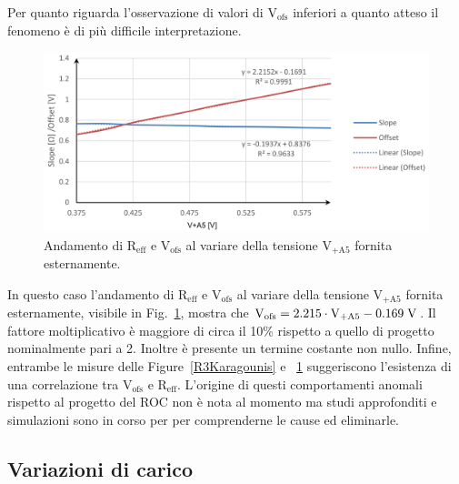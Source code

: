 Per quanto riguarda l'osservazione di valori di $\mathrm{V_{ofs}}$ inferiori a quanto atteso il fenomeno è di più difficile interpretazione.
\begin{figure}
\centering
\includegraphics[width=\textwidth]{Immagini/OffsetKaragounis}
\caption{Andamento di $\mathrm{R_{eff}}$ e $\mathrm{V_{ofs}}$ al variare della tensione $\mathrm{V_{+A5}}$ fornita esternamente.}%
\label{OffsetKaragounis}
\end{figure}
In questo caso l'andamento di $\mathrm{R_{eff}}$ e $\mathrm{V_{ofs}}$ al variare della tensione $\mathrm{V_{+A5}}$ fornita esternamente, visibile in Fig.~\ref{OffsetKaragounis}, mostra che $\mathrm{V_{ofs} = 2.215\cdot V_{+A5}- 0.169\rm \; V}$. Il fattore moltiplicativo \`e maggiore di circa il 10\% rispetto a quello di progetto nominalmente pari a 2. Inoltre \`e presente un termine costante non nullo. Infine, entrambe le misure delle Figure~\ref{R3Karagounis} e ~\ref{OffsetKaragounis} suggeriscono l'esistenza di una correlazione tra $\mathrm{V_{ofs}}$ e $\mathrm{R_{eff}}$. L'origine di questi comportamenti anomali rispetto al progetto del ROC non \`e nota al momento ma studi approfonditi e simulazioni sono in corso per per comprenderne le cause ed eliminarle.

%
%
\subsection{Variazioni di carico}
\label{VariazioniCarico}

